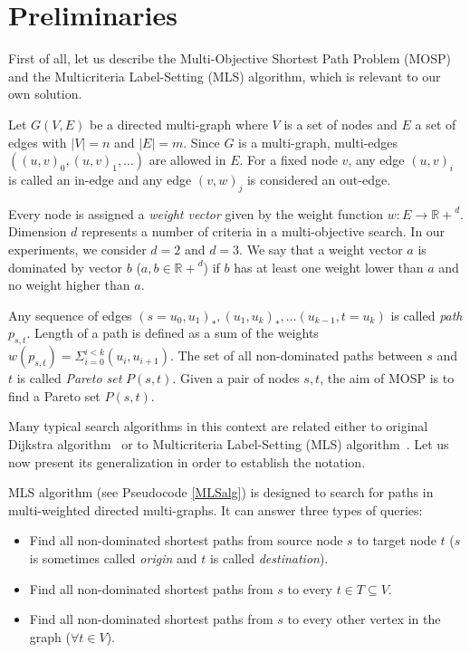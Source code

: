
\section{Preliminaries}
\label{secPreliminaries}

First of all, let us describe the Multi-Objective Shortest Path Problem (MOSP) and the Multicriteria Label-Setting (MLS) algorithm, which is relevant to our own solution.

Let $G(V,E)$ be a directed multi-graph where $V$ is a set of nodes and $E$ a set
of edges with $|V| = n$ and $|E| = m$. Since $G$ is a multi-graph, multi-edges
$((u,v)_0,(u,v)_1,\dots)$ are allowed in $E$. For a fixed node $v$, any edge $(u,v)_i$ is called an in-edge and any edge $(v,w)_j$ is considered an out-edge.

Every node is assigned a \emph{weight vector} given by the weight function $w: E \rightarrow \mathbb{R+}^d$. Dimension $d$ represents a number of criteria in a multi-objective search. 
In our experiments, we consider $d=2$ and $d=3$.
We say that a weight vector $a$ is dominated by vector $b$ ($a,b \in \mathbb{R+}^d$) if
$b$ has at least one weight lower than $a$ and no weight higher than $a$. 

Any sequence of edges $(s=u_0,u_1)_*,(u_1,u_k)_*,\dots(u_{k-1},t=u_k)$ is called
\emph{path} $p_{s,t}$. Length of a path is defined as a sum of the weights 
$w(p_{s,t}) = \Sigma_{i=0}^{i<k} (u_i,u_{i+1})$. The set of all non-dominated paths between $s$ and $t$ is called {\em Pareto set}
$P(s,t)$. Given a pair of nodes $s,t$, the aim of MOSP is to find a Pareto set $P(s,t)$.

\vskip 5mm

Many typical search algorithms in this context are related either to original Dijkstra algorithm~\cite{dijkstra1959note} or to Multicriteria Label-Setting (MLS) algorithm~\cite{martins1984multicriteria}. Let us now present its generalization in order to establish the notation.

MLS algorithm (see Pseudocode \ref{MLSalg}) is designed to search for paths in multi-weighted directed multi-graphs. It can answer three types of queries:
\begin{itemize}
\item Find all non-dominated shortest paths from source node $s$ to target node $t$ ($s$ is sometimes called {\em origin} and $t$ is called {\em destination}).
\item Find all non-dominated shortest paths from $s$ to every $t \in T \subseteq V$.
\item Find all non-dominated shortest paths from $s$ to every other vertex in the graph ($\forall t \in V$).
\end{itemize}

